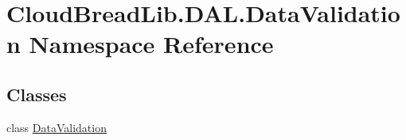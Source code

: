 \hypertarget{namespace_cloud_bread_lib_1_1_d_a_l_1_1_data_validation}{}\section{Cloud\+Bread\+Lib.\+D\+A\+L.\+Data\+Validation Namespace Reference}
\label{namespace_cloud_bread_lib_1_1_d_a_l_1_1_data_validation}
\subsection*{Classes}
\begin{DoxyCompactItemize}
\item 
class \hyperlink{class_cloud_bread_lib_1_1_d_a_l_1_1_data_validation_1_1_data_validation}{Data\+Validation}
\end{DoxyCompactItemize}
